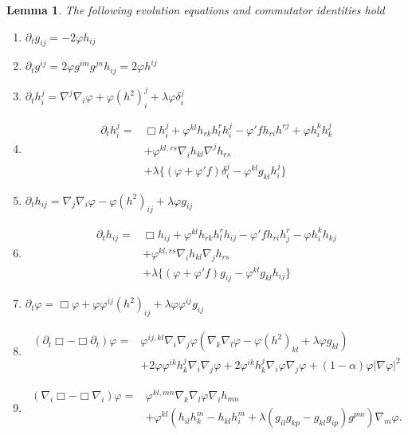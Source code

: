 \documentclass{amsart}
\newtheorem{lemma}[theorem]{Lemma}
\theoremstyle{definition}
\theoremstyle{remark}
\numberwithin{equation}{section}
\begin{document}
\begin{lemma}
The following evolution equations and commutator identities hold
\begin{enumerate}
  \item $\partial_tg_{ij}=-2\varphi h_{ij}$
  \item $\partial_tg^{ij}=2\varphi g^{im}g^{jn}h_{ij}=2\varphi h^{ij}$
  \item $\partial_t h_i^j=\nabla^j\nabla_i\varphi+\varphi(h^2)_i^j+\lambda \varphi\delta_i^j$
  \item \begin{align*}
\partial_t h_i^j=&\Box h_i^j+\varphi^{kl}h_{rk}h_l^rh_i^j-\varphi'fh_{ri}h^{rj}+\varphi h_i^kh_k^j\\
&+\varphi^{kl,rs}\nabla_ih_{kl}\nabla^jh_{rs}\\
&+\lambda \{(\varphi+\varphi'f)\delta_i^j-\varphi^{kl}g_{kl}h_i^j\}
\end{align*}
  \item $\partial_t h_{ij}=\nabla_j\nabla_i\varphi-\varphi(h^2)_{ij}+\lambda \varphi g_{ij}$
\item \begin{align*}
\partial_t h_{ij}=&\Box h_{ij}+\varphi^{kl}h_{rk}h_l^rh_{ij}-\varphi'fh_{ri}h_j^r-\varphi h_i^kh_{kj}\\
&+\varphi^{kl,rs}\nabla_ih_{kl}\nabla_jh_{rs}\\
&+\lambda \{(\varphi+\varphi'f)g_{ij}-\varphi^{kl}g_{kl}h_{ij}\}
\end{align*}
  \item $\partial_t \varphi=\Box \varphi+\varphi\varphi^{ij}(h^2)_{ij}+\lambda \varphi\varphi^{ij}g_{ij}$
  \item \begin{align*}
(\partial_t\Box-\Box\partial_t)\varphi=&\varphi^{ij,kl}\nabla_i\nabla_j\varphi(\nabla_k\nabla_l\varphi-\varphi(h^2)_{kl}+\lambda \varphi g_{kl})\\
&+2\varphi\varphi^{ik}h_k^j\nabla_i\nabla_j\varphi+2\varphi^{ik}h_k^j\nabla_i\varphi\nabla_j\varphi+(1-\alpha)\varphi|\nabla \varphi|^2
\end{align*}
\item \begin{align*}
(\nabla_i\Box-\Box\nabla_i)\varphi=&\varphi^{kl,mn}\nabla_k\nabla_l\varphi\nabla_ih_{mn}\\
&+\varphi^{kl}(h_{il}h_k^m-h_{kl}h_i^m+\lambda(g_{il}g_{kp}-g_{kl}g_{ip})g^{pm})\nabla_m\varphi.
\end{align*}
\end{enumerate}
\end{lemma}
\end{document}
